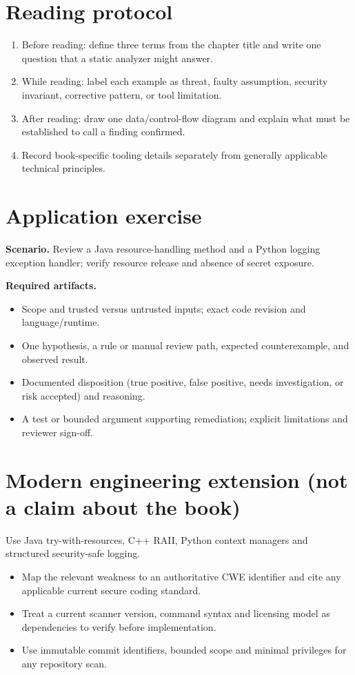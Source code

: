 \documentclass[10pt,letterpaper]{article}
\begin{document}
\section{Reading protocol}
\begin{enumerate}
\item Before reading: define three terms from the chapter title and write one question that a static analyzer might answer.
\item While reading: label each example as threat, faulty assumption, security invariant, corrective pattern, or tool limitation.
\item After reading: draw one data/control-flow diagram and explain what must be established to call a finding confirmed.
\item Record book-specific tooling details separately from generally applicable technical principles.
\end{enumerate}

\section{Application exercise}
\textbf{Scenario.} Review a Java resource-handling method and a Python logging exception handler; verify resource release and absence of secret exposure.

\textbf{Required artifacts.}\begin{itemize}
\item Scope and trusted versus untrusted inputs; exact code revision and language/runtime.
\item One hypothesis, a rule or manual review path, expected counterexample, and observed result.
\item Documented disposition (true positive, false positive, needs investigation, or risk accepted) and reasoning.
\item A test or bounded argument supporting remediation; explicit limitations and reviewer sign-off.
\end{itemize}

\section{Modern engineering extension (not a claim about the book)}
Use Java try-with-resources, C++ RAII, Python context managers and structured security-safe logging.

\begin{itemize}
\item Map the relevant weakness to an authoritative CWE identifier and cite any applicable current secure coding standard.
\item Treat a current scanner version, command syntax and licensing model as dependencies to verify before implementation.
\item Use immutable commit identifiers, bounded scope and minimal privileges for any repository scan.
\end{itemize}
\end{document}
